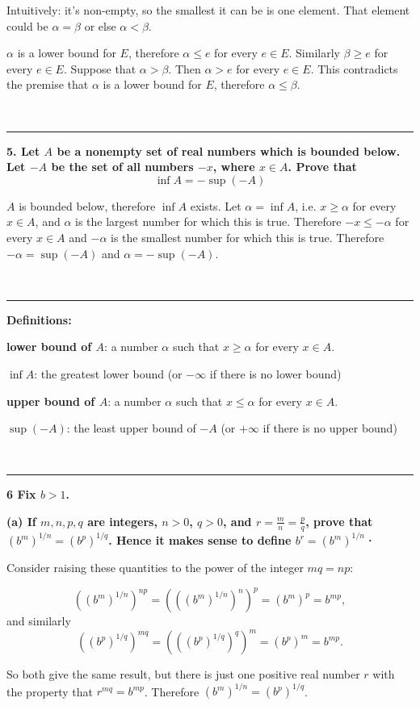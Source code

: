 Intuitively: it's non-empty, so the smallest it can be is one element. That
element could be $\alpha = \beta$ or else $\alpha < \beta$.

$\alpha$ is a lower bound for $E$, therefore $\alpha \leq e$ for every $e \in
E$. Similarly $\beta \geq e$ for every $e \in E$. Suppose that $\alpha >
\beta$. Then $\alpha > e$ for every $e \in E$. This contradicts the premise
that $\alpha$ is a lower bound for $E$, therefore $\alpha \leq \beta$.


~\\\hrule
\textbf{5. Let $A$ be a nonempty set of real numbers which is bounded below. Let $-A$
be the set of all numbers $-x$, where $x \in A$. Prove that
$$
\inf A = - \sup(-A)
$$
}

$A$ is bounded below, therefore $\inf A$ exists. Let $\alpha = \inf A$, i.e. $x
\geq \alpha$ for every $x \in A$, and $\alpha$ is the largest number for which
this is true. Therefore $-x \leq -\alpha$ for every $x \in A$ and $-\alpha$ is
the smallest number for which this is true. Therefore $-\alpha=\sup(-A)$ and
$\alpha=-\sup(-A)$.


~\\\hrule
\textbf{Definitions:}

\textbf{lower bound of $A$}: a number $\alpha$ such that $x \geq \alpha$ for every $x \in A$.

\textbf{$\inf A$}: the greatest lower bound (or $-\infty$ if there is no lower bound)

\textbf{upper bound of $A$}: a number $\alpha$ such that $x \leq \alpha$ for every $x \in A$.

\textbf{$\sup(-A)$}: the least upper bound of $-A$ (or $+\infty$ if there is no upper bound)

~\\\hrule
\textbf{6 Fix $b > 1$.}

\textbf{
(a) If $m,n,p,q$ are integers, $n>0$, $q>0$, and $r=\frac{m}{n}=\frac{p}{q}$,
prove that $(b^m)^{1/n} = (b^p)^{1/q}$. Hence it makes sense to define $b^r =
(b^m)^{1/n}$·}

Consider raising these quantities to the power of the integer $mq = np$:

$$
((b^m)^{1/n})^{np} = (((b^m)^{1/n})^{n})^p = (b^m)^p = b^{mp},
$$
and similarly
$$
((b^p)^{1/q})^{mq} = (((b^p)^{1/q})^{q})^m = (b^p)^m = b^{mp}.
$$

So both give the same result, but there is just one positive real number $r$
with the property that $r^{mq} = b^{mp}$. Therefore $(b^m)^{1/n} =
(b^p)^{1/q}$.


